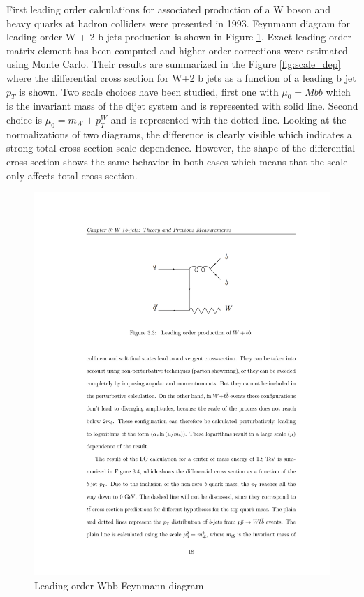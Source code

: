 \par First leading order calculations for associated production of a W boson and heavy quarks at hadron colliders were presented in 1993. Feynmann diagram for leading order W + 2 b jets production is shown in Figure \ref{fig:LO_diag}. Exact leading order matrix element has been computed and higher order corrections were estimated using Monte Carlo. Their results are summarized in the Figure \ref{fig:scale_dep} where the differential cross section for W+2 b jets as a function of a leading b jet $p_T$ is shown. Two scale choices have been studied, first one with $\mu_0=Mbb$ which is the invariant mass of the dijet system and is represented with solid line. Second choice is $\mu_0=m_W+p_T^W$ and is represented with the dotted line. Looking at the normalizations of two diagrams, the difference is clearly visible which indicates a strong total cross section scale dependence. However, the shape of the differential cross section shows the same behavior in both cases which means that the scale only affects total cross section.      
\begin{figure}[htbp]
	\centering
		\includegraphics{Figures/LO_diag.pdf}
	\caption[Leading order Wbb Feynmann diagram]{Leading order Wbb Feynmann diagram}
	\label{fig:LO_diag}
\end{figure}
